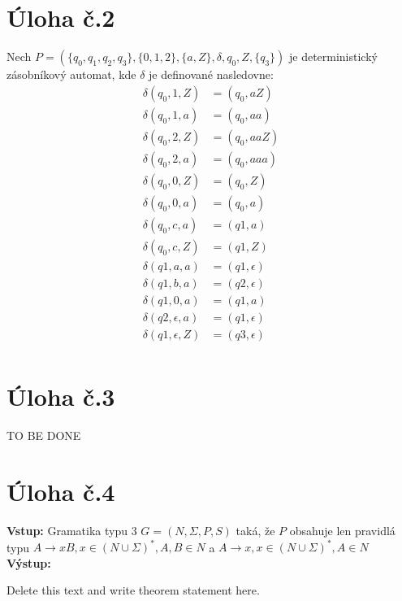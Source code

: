 \documentclass[11pt]{article}
\newenvironment{theorem}[2][Theorem]{\begin{trivlist}
\item[\hskip \labelsep {\bfseries #1}\hskip \labelsep {\bfseries #2.}]}{\end{trivlist}}
\begin{document}
\section*{Úloha č.2}
    Nech $P = (\{q_0, q_1, q_2, q_3\}, \{0,1,2\}, \{a,Z\}, \delta, q_0, Z, \{q_3\})$ je deterministický zásobníkový automat, kde
    $\delta$ je definované nasledovne:
    \begin{align*}
        \delta (q_0, 1, Z) &= (q_0, aZ)\\
        \delta (q_0, 1, a) &= (q_0, aa)\\
        \delta (q_0, 2, Z) &= (q_0, aaZ)\\
        \delta (q_0, 2, a) &= (q_0, aaa)\\
        \delta (q_0, 0, Z) &= (q_0, Z)\\
        \delta (q_0, 0, a) &= (q_0, a)\\
        \delta (q_0, c, a) &= (q1, a)\\
        \delta (q_0, c, Z) &= (q1, Z)\\
        \delta (q1, a, a) &= (q1, \epsilon)\\
        \delta (q1, b, a) &= (q2, \epsilon)\\
        \delta (q1, 0, a) &= (q1, a)\\
        \delta (q2, \epsilon, a) &= (q1, \epsilon)\\
        \delta (q1, \epsilon, Z) &= (q3, \epsilon)\\
    \end{align*}


\section*{Úloha č.3}
TO BE DONE

\section*{Úloha č.4}

\textbf{Vstup:} Gramatika typu 3 $G = (N, \Sigma, P, S)$ taká, že $P$ obsahuje len pravidlá typu
$A\to xB, x \in (N\cup\Sigma)^*, A,B \in N$ a $A\to x, x \in (N\cup\Sigma)^*, A \in N$\\
\textbf{Výstup:}

\begin{theorem}{x.yz} %
Delete this text and write theorem statement here.
\end{theorem}
 
\end{document}
